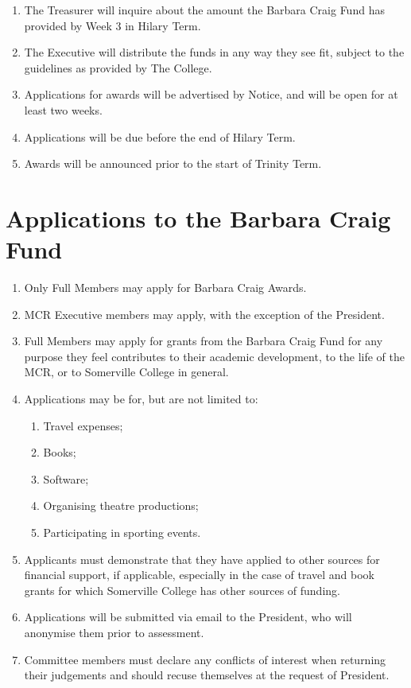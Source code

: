 \documentclass[11pt, a4paper]{article}
\begin{document}
\begin{enumerate}
	\item The Treasurer will inquire about the amount the Barbara Craig Fund has provided by Week 3 in Hilary Term.
    \item The Executive will distribute the funds in any way they see fit, subject to the guidelines as provided by The College.
    \item Applications for awards will be advertised by Notice, and will be open for at least two weeks.
    \item Applications will be due before the end of Hilary Term.
    \item Awards will be announced prior to the start of Trinity Term.
\end{enumerate}





\section{Applications to the Barbara Craig Fund}
\label{sec:applications}

\begin{enumerate}
	\item Only Full Members may apply for Barbara Craig Awards.
    \item MCR Executive members may apply, with the exception of the President.
    \item Full Members may apply for grants from the Barbara Craig Fund for any purpose they feel contributes to their academic development, to the life of the MCR, or to Somerville College in general.
    \item Applications may be for, but are not limited to:
    	\begin{enumerate}
        	\item Travel expenses;
            \item Books;
            \item Software;
            \item Organising theatre productions;
            \item Participating in sporting events.
        \end{enumerate}
    \item Applicants must demonstrate that they have applied to other sources for financial support, if applicable, especially in the case of travel and book grants for which Somerville College has other sources of funding.
    \item Applications will be submitted via email to the President, who will anonymise them prior to  assessment.
    \item Committee members must declare any conflicts of interest when returning their judgements and should recuse themselves at the request of President.
\end{enumerate}
\end{document}
